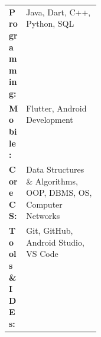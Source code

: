 \begin{tabularx}{\linewidth}{@{}>{\bfseries}p{0.18\linewidth}X@{}}
  Programming: & Java, Dart, C++, Python, SQL \\
  Mobile: & Flutter, Android Development \\
  Core CS: & Data Structures \& Algorithms, OOP, DBMS, OS, Computer Networks \\
  Tools \& IDEs: & Git, GitHub, Android Studio, VS Code
\end{tabularx}
